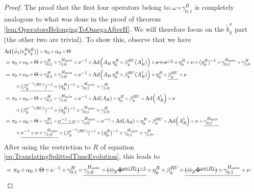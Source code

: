 \documentclass[11pt,a4paper,twoside]{article}
\numberwithin{equation}{section}
\begin{document}
	\begin{proof}
		The proof that the first four operators belong to $\omega\circ\gamma^H_{0;1}$ is completely analogous to what was done in the proof of theorem \ref{lem:OperatorsBelongingToOmegaAfterH}. We will therefore focus on the $\tilde{b}_g^\sigma$ part (the other two are trivial). To show this, observe that we have
		\begin{align}
			&\Ad{\phiTilde_1(\epsilon_g^R b_g^R)}\circ\pi_0\circ\alpha_0\circ\Theta\\
			&=\pi_0\circ\alpha_0\circ\Theta\circ\gamma^H_{0;1}\circ\gamma^{\Hsplit}_{1;0}\circ\nu^{-1}\circ\Ad{A_R\: \eta_g^R\circ\beta_g^{RU}(A_R^\dagger)}\circ\stkout{\nu\circ\nu^{-1}}\circ\eta_g^R\circ\nu\circ(\eta_g^R)^{-1}\circ\gamma^{\Hsplit}_{0;1}\circ\gamma^{H}_{1;0}\\
			&=\pi_0\circ\alpha_0\circ\Theta\circ\gamma^H_{0;1}\circ\gamma^{\Hsplit}_{1;0}\circ\nu^{-1}\circ\Ad{A_R\: \eta_g^R\circ\beta_g^{RU}(A_R^\dagger)}\circ\eta_g^R\circ\underline{\beta_g^{RU}}\circ\nu\\
			\nonumber
			&\qquad\circ\underline{(\beta_g^{\nu^{-1}(RU)})^{-1}}\circ(\eta_g^R)^{-1}\circ\gamma^{\Hsplit}_{0;1}\circ\gamma^{H}_{1;0}\\
			&=\pi_0\circ\alpha_0\circ\Theta\circ\gamma^H_{0;1}\circ\gamma^{\Hsplit}_{1;0}\circ\nu^{-1}\circ\Ad{A_R}\circ\eta_g^R\circ\beta_g^{RU}\circ\Ad{A_R^\dagger}\circ\nu\\
			\nonumber
			&\qquad\circ(\beta_g^{\nu^{-1}(RU)})^{-1}\circ(\eta_g^R)^{-1}\circ\gamma^{\Hsplit}_{0;1}\circ\gamma^{H}_{1;0}\\
			&=\pi_0\circ\alpha_0\circ\Theta\circ\gamma^H_{0;1}\circ\underline{\nu^{-1}\circ\nu}\circ\gamma^{\Hsplit}_{1;0}\circ\nu^{-1}\circ\Ad{A_R}\circ\eta_g^R\circ\beta_g^{RU}\circ\Ad{A_R^\dagger}\circ\nu\circ\underline{\gamma^{\Hsplit}_{0;1}}\\
			\nonumber
			&\qquad \circ\underline{\nu^{-1}\circ\nu\circ\gamma^{\Hsplit}_{1;0}}\circ(\beta_g^{\nu^{-1}(RU)})^{-1}\circ(\eta_g^R)^{-1}\circ\gamma^{\Hsplit}_{0;1}\circ\gamma^{H}_{1;0}.
		\end{align}
		After using the restriction to $R$ of equation \eqref{eq:TranslatingSplittedTimeEvolution}, this leads to
		\begin{align}
			&=\pi_0\circ\alpha_0\circ\Theta\circ\nu^{-1}\circ\gamma^H_{0;1}\circ\underline{\gamma^{\Hsplit}_{1;0}\circ\stkout{(\otimes_\mu\Phi^{\mu\nu(R)})^{-1}}}\circ\eta_g^R\circ\beta_g^{RU}\circ\underline{\stkout{(\otimes_\mu\Phi^{\mu\nu(R)})}\circ\gamma^{\Hsplit}_{0;1}}\circ\nu\\

\end{align}
\end{proof}
\end{document}
